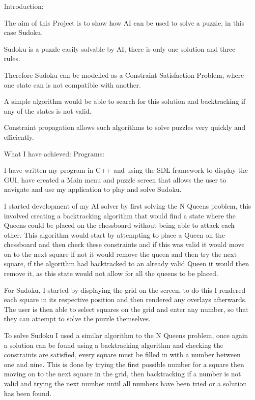 \documentclass[]{final_report}
\begin{document}
\maketitle

{ \huge \bfseries {
		Introduction:
		
		The aim of this Project is to show how AI can be used to solve a puzzle, in this case Sudoku.
		
		Sudoku is a puzzle easily solvable by AI, there is only one solution and three rules.
		
		Therefore Sudoku can be modelled as a Constraint Satisfaction Problem, where one state can is not compatible with another.
		
		A simple algorithm would be able to search for this solution and backtracking if any of the states is not valid.
		
		Constraint propagation allows such algorithms to solve puzzles very quickly and efficiently.
		
		\newpage
		What I have achieved:
		\newline
		Programs:
		
		I have written my program in C++ and using the SDL framework to display the GUI, have created a Main menu and puzzle screen that allows the user to navigate and use my application to play and solve Sudoku.
		
		I started development of my AI solver by first solving the N Queens problem, this involved creating a backtracking algorithm that would find a state where the Queens could be placed on the chessboard without being able to attack each other.
		\newpage
		This algorithm would start by attempting to place a Queen on the chessboard and then check these constraints and if this was valid it would move on to the next square if not it would remove the queen and then try the next square, if the algorithm had backtracked to an already valid Queen it would then remove it, as this state would not allow for all the queens to be placed.
		
		For Sudoku, I started by displaying the grid on the screen, to do this I rendered each square in its respective position and then rendered any overlays afterwards. The user is then able to select squares on the grid and enter any number, so that they can attempt to solve the puzzle themselves.
		
		To solve Sudoku I used a similar algorithm to the N Queens problem, once again a solution can be found using a backtracking algorithm and checking the constraints are satisfied, every square must be filled in with a number between one and nine. This is done by trying the first possible number for a square then moving on to the next square in the grid, then backtracking if a number is not valid and trying the next number until all numbers have been tried or a solution has been found.
		
}}
\end{document}
